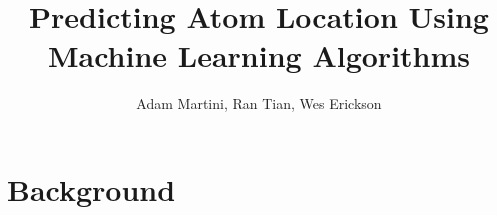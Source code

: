 \documentclass{beamer}
\title[Predicting Atom Location Using Machine Learning Algorithms]{Predicting Atom Location Using \\ Machine Learning Algorithms} %
\author{Adam Martini, Ran Tian, Wes Erickson} %
\institute[UO] %
{
University of Oregon \\ %
\medskip
\textit{martini@cs.uoregon.edu\\} %
\textit{jmty0083@cs.uoregon.edu\\}
\textit{wwe@uoregon.edu}
}
\date{\displaydate{date}} %
\begin{document}
\begin{frame}
\titlepage %
\end{frame}


%
%
%



\section{Background} %
\end{document}

